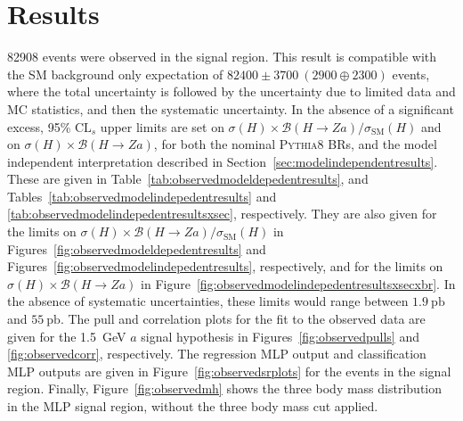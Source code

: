 \documentclass[NOTE, atlasdraft=true, texlive=2017, UKenglish]{\ATLASLATEXPATH atlasdoc}
\begin{document}


\clearpage
\section{Results}
\label{sec:result}

82908 events were observed in the signal region. This result is compatible with the SM background only expectation of $82400 \pm 3700\ (2900\oplus 2300)$ events, where the total uncertainty is followed by the uncertainty due to limited data and MC statistics, and then the systematic uncertainty. In the absence of a significant excess, 95\% $\text{CL}_s$ upper limits are set on $\sigma(H) \times\mathcal{B}(H\to Za) / \sigma_\text{SM}(H)$ and on $\sigma(H) \times\mathcal{B}(H\to Za)$, for both the nominal \textsc{Pythia}8 BRs, and the model independent interpretation described in Section~\ref{sec:modelindependentresults}. These are given in Table~\ref{tab:observedmodeldepedentresults}, and Tables~\ref{tab:observedmodelindepedentresults} and \ref{tab:observedmodelindepedentresultsxsec}, respectively. They are also given for the limits on $\sigma(H) \times\mathcal{B}(H\to Za) / \sigma_\text{SM}(H)$ in Figures~\ref{fig:observedmodeldepedentresults} and Figures~\ref{fig:observedmodelindepedentresults}, respectively, and for the limits on $\sigma(H) \times\mathcal{B}(H\to Za)$ in Figure~\ref{fig:observedmodelindepedentresultsxsecxbr}. In the absence of systematic uncertainties, these limits would range between $1.9~\text{pb}$ and $55~\text{pb}$. The pull and correlation plots for the fit to the observed data are given for the 1.5~GeV $a$ signal hypothesis in Figures~\ref{fig:observedpulls} and \ref{fig:observedcorr}, respectively. The regression MLP output and classification MLP outputs are given in Figure~\ref{fig:observedsrplots} for the events in the signal region. Finally, Figure~\ref{fig:observedmh} shows the three body mass distribution in the MLP signal region, without the three body mass cut applied.
\end{document}
